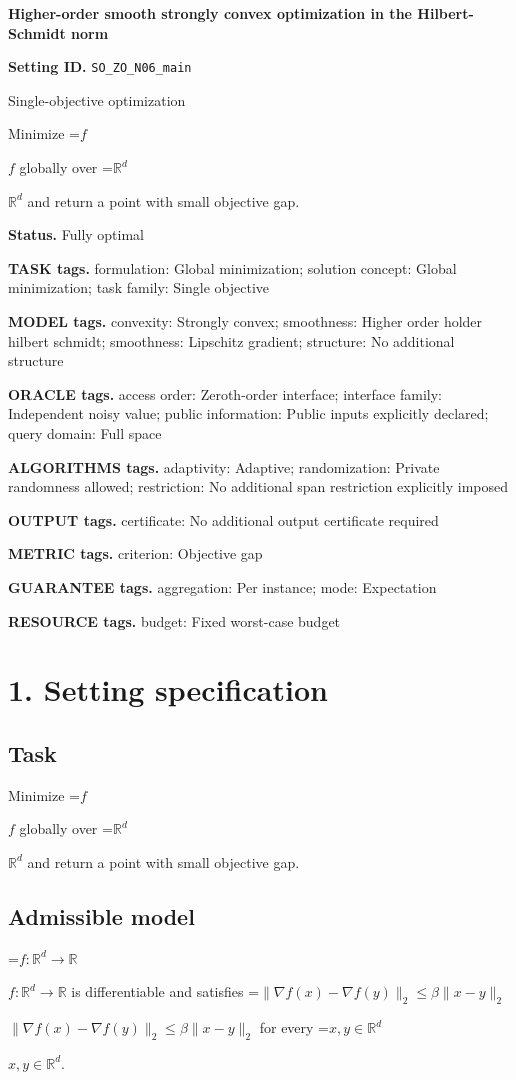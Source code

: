 \documentclass[10pt,a4paper]{article}
\newcommand{\AtlasMath}[1]{\par\begingroup\centering\setbox0=\hbox{$\displaystyle #1$}\ifdim\wd0>1.4\linewidth\typeout{ATLAS WIDE FORMULA: \the\wd0}\fi\ifdim\wd0>\linewidth\resizebox{\linewidth}{!}{\box0}\else\box0\fi\par\endgroup}
\newcommand{\AtlasInlineMath}[1]{\begingroup\setbox0=\hbox{$#1$}\ifdim\wd0>.4\linewidth\endgroup\AtlasMath{#1}\else\endgroup$#1$\fi}
\begin{document}
\raggedright

{\LARGE\bfseries\sffamily\color{AtlasNavy} Higher-order smooth strongly convex optimization in the Hilbert-Schmidt norm\par}\vspace{5pt}
\textbf{Setting ID.} \texttt{SO\_\allowbreak{}ZO\_\allowbreak{}N06\_\allowbreak{}main}

Single-objective optimization

Minimize \AtlasInlineMath{f} globally over \AtlasInlineMath{\mathbb{R}^d} and return a point with small objective gap.

\textbf{Status.} Fully optimal

\textbf{TASK tags.} formulation: Global minimization; solution concept: Global minimization; task family: Single objective

\textbf{MODEL tags.} convexity: Strongly convex; smoothness: Higher order holder hilbert schmidt; smoothness: Lipschitz gradient; structure: No additional structure

\textbf{ORACLE tags.} access order: Zeroth-order interface; interface family: Independent noisy value; public information: Public inputs explicitly declared; query domain: Full space

\textbf{ALGORITHMS tags.} adaptivity: Adaptive; randomization: Private randomness allowed; restriction: No additional span restriction explicitly imposed

\textbf{OUTPUT tags.} certificate: No additional output certificate required

\textbf{METRIC tags.} criterion: Objective gap

\textbf{GUARANTEE tags.} aggregation: Per instance; mode: Expectation

\textbf{RESOURCE tags.} budget: Fixed worst-case budget

\section{1. Setting specification}
\subsection{Task}
Minimize \AtlasInlineMath{f} globally over \AtlasInlineMath{\mathbb{R}^d} and return a point with small objective gap.

\subsection{Admissible model}
\AtlasInlineMath{f:\mathbb{R}^d\to\mathbb{R}} is differentiable and satisfies \AtlasInlineMath{\|\nabla f(x)-\nabla f(y)\|_2\le\beta\|x-y\|_2} for every \AtlasInlineMath{x,y\in\mathbb{R}^d}.
\end{document}
